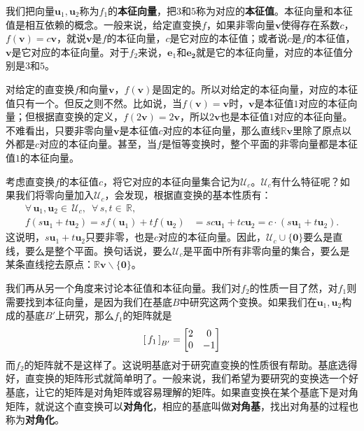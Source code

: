 \documentclass[12pt,UTF8,fontset=none]{ctexbook}
\begin{document}
我们把向量$\mathbf{u}_1,\mathbf{u}_2$称为$f_1$的\textbf{本征向量}，把$3$和$5$称为对应的\textbf{本征值}。本征向量和本征值是相互依赖的概念。一般来说，给定直变换$f$，如果非零向量$\mathbf{v}$使得存在系数$c$，$f(\mathbf{v}) = c\mathbf{v}$，就说$\mathbf{v}$是$f$的本征向量，$c$是它对应的本征值；或者说$c$是$f$的本征值，$\mathbf{v}$是它对应的本征向量。对于$f_2$来说，$\mathbf{e}_1$和$\mathbf{e_2}$就是它的本征向量，对应的本征值分别是$3$和$5$。

对给定的直变换$f$和向量$\mathbf{v}$，$f(\mathbf{v})$是固定的。所以对给定的本征向量，对应的本征值只有一个。但反之则不然。比如说，当$f(\mathbf{v}) = \mathbf{v}$时，$\mathbf{v}$是本征值$1$对应的本征向量；但根据直变换的定义，$f(2\mathbf{v}) = 2\mathbf{v}$，所以$2\mathbf{v}$也是本征值$1$对应的本征向量。不难看出，只要非零向量$\mathbf{v}$是本征值$c$对应的本征向量，那么直线$\mathbb{R}\mathbf{v}$里除了原点以外都是$c$对应的本征向量。甚至，当$f$是恒等变换时，整个平面的非零向量都是本征值$1$的本征向量。

考虑直变换$f$的本征值$c$，将它对应的本征向量集合记为$\mathcal{U}_c$。$\mathcal{U}_c$有什么特征呢？如果我们将零向量加入$\mathcal{U}_c$，会发现，根据直变换的基本性质有：
\begin{align*}
\forall\,\mathbf{u}_1,\mathbf{u}_2\in\,\mathcal{U}_c,\,\,\,\forall \,s, t\in\,\mathbb{R},\qquad\qquad\\
 f(s\mathbf{u}_1+t\mathbf{u}_2) = sf(\mathbf{u}_1)+tf(\mathbf{u}_2) &= sc\mathbf{u}_1 + tc\mathbf{u}_2 = c\cdot(s\mathbf{u}_1+t\mathbf{u}_2).
\end{align*}
这说明，$s\mathbf{u}_1+t\mathbf{u}_2$只要非零，也是$c$对应的本征向量。因此，$\mathcal{U}_c\cup\{\mathbf{0}\}$要么是直线，要么是整个平面。换句话说，要么$\mathcal{U}_c$是平面中所有非零向量的集合，要么是某条直线挖去原点：$\mathbb{R}\mathbf{v}\backslash \{\mathbf{0}\}$。

我们再从另一个角度来讨论本征值和本征向量。我们对$f_2$的性质一目了然，对$f_1$则需要找到本征向量，是因为我们在基底$B$中研究这两个变换。如果我们在$\mathbf{u}_1,\mathbf{u}_2$构成的基底$B'$上研究，那么$f_1$的矩阵就是
$$
\bmat{f_1}[B'] = 
\begin{bmatrix}
    2 & 0  \\ 0 & -1
\end{bmatrix}
$$
而$f_2$的矩阵就不是这样了。这说明基底对于研究直变换的性质很有帮助。基底选得好，直变换的矩阵形式就简单明了。一般来说，我们希望为要研究的变换选一个好基底，让它的矩阵是对角矩阵或容易理解的矩阵。如果直变换在某个基底下是对角矩阵，就说这个直变换可以\textbf{对角化}，相应的基底叫做\textbf{对角基}，找出对角基的过程也称为\textbf{对角化}。
\end{document}
